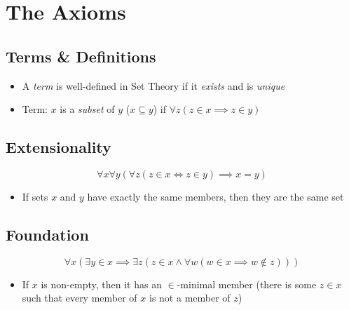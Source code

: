 \section{The Axioms}

\subsection{Terms \& Definitions}

\begin{itemize}
	
	\item A \textit{term} is well-defined in Set Theory if it \textit{exists} and is \textit{unique}
	
	\item Term: $ x $ is a \textit{subset} of $ y $ ($ x \subseteq y$) if $ \forall z (z \in x \implies z \in y) $
	
\end{itemize}

\subsection{Extensionality}
\begin{equation*}
\forall x \forall y (\forall z (z \in x \iff z \in y) \implies x = y)
\end{equation*}

\begin{itemize}
	
	\item If sets $ x $ and $ y $ have exactly the same members, then they are the same set
	
\end{itemize}

\subsection{Foundation}
\begin{equation*}
\forall x (\exists y \in x \implies \exists z (z \in x \land \forall w (w \in x \implies w \notin z)))
\end{equation*}

\begin{itemize}
	
	\item If $ x $ is non-empty, then it has an $ \in $-minimal member (there is some $ z \in x $ such that every member of $ x $ is not a member of $ z $)
	
\end{itemize}


